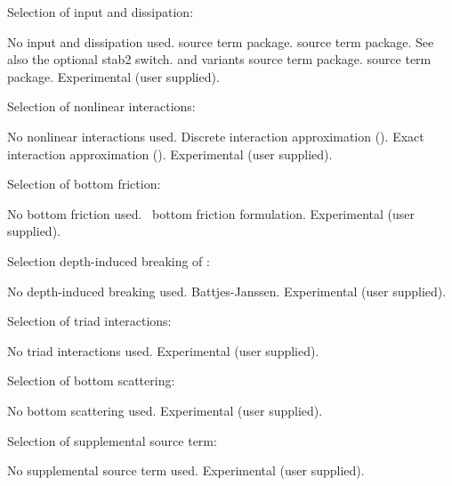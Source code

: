 \noindent
Selection of input and dissipation:
\begin{slist}
 {No input and dissipation used.}
 {\wam{} source term package.}
 {\cite{tol:JPO96} source term package. See also
          the optional {\sc stab2} switch.}
 {\wam{} and variants source term package.}
 {\cite{art:Aea10} source term package.}
 {Experimental (user supplied).}
\end{slist}

\noindent
Selection of nonlinear interactions:
\begin{slist}
 {No nonlinear interactions used.}
 {Discrete interaction approximation (\dia).}
 {Exact interaction approximation (\xnl).}
 {Experimental (user supplied).}
\end{slist}

\noindent
Selection of bottom friction:
\begin{slist}
 {No bottom friction used.}
 {\js\ bottom friction formulation.}
 {Experimental (user supplied).}
\end{slist}

\noindent
Selection depth-induced breaking of :
\begin{slist}
 {No depth-induced breaking used.}
 {Battjes-Janssen.}
 {Experimental (user supplied).}
\end{slist}

\noindent
Selection of triad interactions:
\begin{slist}
 {No triad interactions used.}
 {Experimental (user supplied).}
\end{slist}

\noindent
Selection of bottom scattering:
\begin{slist}
 {No bottom scattering used.}
 {Experimental (user supplied).}
\end{slist}

\noindent
Selection of supplemental source term:
\begin{slist}
 {No supplemental source term used.}
 {Experimental (user supplied).}
\end{slist}

